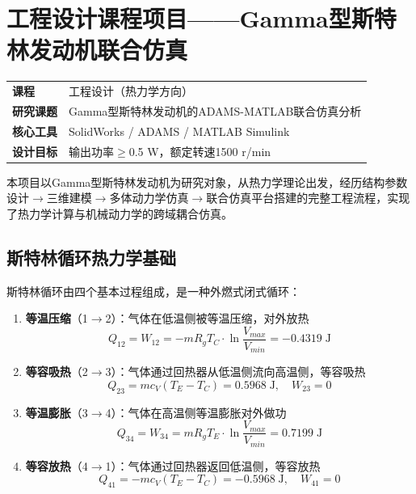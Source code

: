 \documentclass[12pt,a4paper]{ctexart}
\begin{document}
\newpage
\section{工程设计课程项目——Gamma型斯特林发动机联合仿真}

\begin{infobox}[项目概况]
\begin{tabular}{ll}
\textbf{课程} & 工程设计（热力学方向） \\
\textbf{研究课题} & Gamma型斯特林发动机的ADAMS-MATLAB联合仿真分析 \\
\textbf{核心工具} & SolidWorks / ADAMS / MATLAB Simulink \\
\textbf{设计目标} & 输出功率$\geq$0.5 W，额定转速1500 r/min
\end{tabular}
\end{infobox}

本项目以Gamma型斯特林发动机为研究对象，从热力学理论出发，经历结构参数设计$\to$三维建模$\to$多体动力学仿真$\to$联合仿真平台搭建的完整工程流程，实现了热力学计算与机械动力学的跨域耦合仿真。

\subsection{斯特林循环热力学基础}

斯特林循环由四个基本过程组成，是一种外燃式闭式循环：

\begin{enumerate}
    \item \textbf{等温压缩}（1$\to$2）：气体在低温侧被等温压缩，对外放热
    \[
    Q_{12} = W_{12} = -mR_gT_C \cdot \ln\frac{V_{max}}{V_{min}} = -0.4319\;\text{J}
    \]
    \item \textbf{等容吸热}（2$\to$3）：气体通过回热器从低温侧流向高温侧，等容吸热
    \[
    Q_{23} = mc_V(T_E - T_C) = 0.5968\;\text{J}, \quad W_{23} = 0
    \]
    \item \textbf{等温膨胀}（3$\to$4）：气体在高温侧等温膨胀对外做功
    \[
    Q_{34} = W_{34} = mR_gT_E \cdot \ln\frac{V_{max}}{V_{min}} = 0.7199\;\text{J}
    \]
    \item \textbf{等容放热}（4$\to$1）：气体通过回热器返回低温侧，等容放热
    \[
    Q_{41} = -mc_V(T_E - T_C) = -0.5968\;\text{J}, \quad W_{41} = 0
    \]
\end{enumerate}
\end{document}
